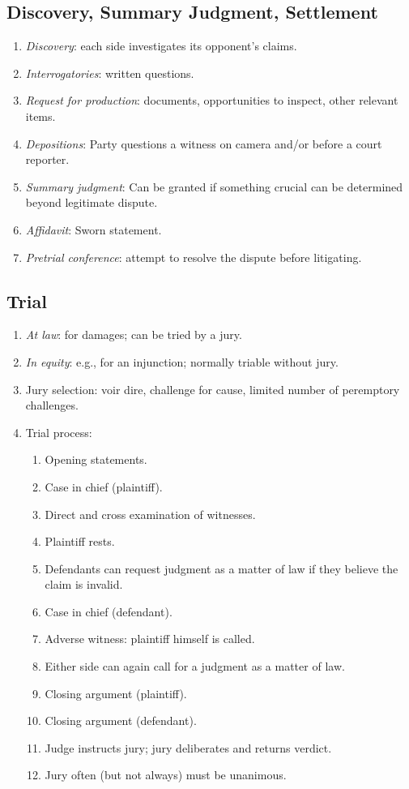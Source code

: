 \subsection{Discovery, Summary Judgment, Settlement}

\begin{enumerate}
    \item \emph{Discovery}: each side investigates its opponent's claims.
    \item \emph{Interrogatories}: written questions.
    \item \emph{Request for production}: documents, opportunities to inspect, 
    other relevant items.
    \item \emph{Depositions}: Party questions a witness on camera and/or 
    before a court reporter.
    \item \emph{Summary judgment}: Can be granted if something crucial can be 
    determined beyond legitimate dispute.
    \item \emph{Affidavit}: Sworn statement.
    \item \emph{Pretrial conference}: attempt to resolve the dispute before 
    litigating.
\end{enumerate}

\subsection{Trial}

\begin{enumerate}
    \item \emph{At law}: for damages; can be tried by a jury.
    \item \emph{In equity}: e.g., for an injunction; normally triable without 
    jury.
    \item Jury selection: voir dire, challenge for cause, limited number of 
    peremptory challenges.
    \item Trial process:
    \begin{enumerate}
        \item Opening statements.
        \item Case in chief (plaintiff).
        \item Direct and cross examination of witnesses.
        \item Plaintiff rests.
        \item Defendants can request judgment as a matter of law if they 
        believe the claim is invalid.
        \item Case in chief (defendant).
        \item Adverse witness: plaintiff himself is called.
        \item Either side can again call for a judgment as a matter of law.
        \item Closing argument (plaintiff).
        \item Closing argument (defendant).
        \item Judge instructs jury; jury deliberates and returns verdict.
        \item Jury often (but not always) must be unanimous.
    \end{enumerate}
\end{enumerate}

